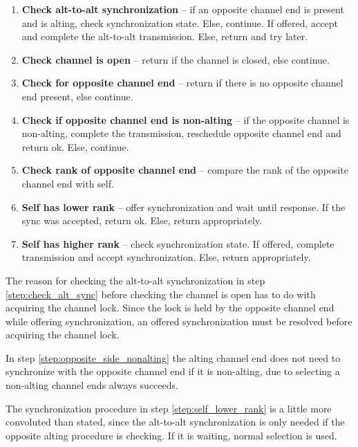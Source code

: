 \begin{enumerate}[topsep=0em,itemsep=-1em,partopsep=0.5em,parsep=1em]
    \item \textbf{Check alt\hyp{}to\hyp{}alt synchronization} -- if an opposite channel end is present and is alting, check synchronization state. Else, continue. If offered, accept and complete the alt\hyp{}to\hyp{}alt transmission. Else, return and try later.
    \label{step:check_alt_sync}
    \item \textbf{Check channel is open} -- return if the channel is closed, else continue.
    \item \textbf{Check for opposite channel end} -- return if there is no opposite channel end present, else continue.
    \item \textbf{Check if opposite channel end is non\hyp{}alting} -- if the opposite channel is non\hyp{}alting, complete the transmission, reschedule opposite channel end and return ok. Else, continue.
    \label{step:opposite_side_nonalting}
    \item \textbf{Check rank of opposite channel end} -- compare the rank of the opposite channel end with self.
    \item \textbf{Self has lower rank} -- offer synchronization and wait until response. If the sync was accepted, return ok. Else, return appropriately.
    \label{step:self_lower_rank}
    \item \textbf{Self has higher rank} -- check synchronization state. If offered, complete transmission and accept synchronization. Else, return appropriately.
    \label{step:self_higher_rank}
\end{enumerate}

The reason for checking the alt\hyp{}to\hyp{}alt synchronization in step \ref{step:check_alt_sync} before checking the channel is open has to do with acquiring the channel lock. Since the lock is held by the opposite channel end while offering synchronization, an offered synchronization must be resolved before acquiring the channel lock.

In step \ref{step:opposite_side_nonalting} the alting channel end does not need to synchronize with the opposite channel end if it is non\hyp{}alting, due to selecting a non\hyp{}alting channel ends always succeeds. 

The synchronization procedure in step \ref{step:self_lower_rank} is a little more convoluted than stated, since the alt\hyp{}to\hyp{}alt synchronization is only needed if the opposite alting procedure is checking. If it is waiting, normal selection is used.

